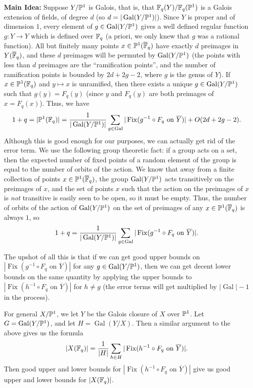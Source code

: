 \documentclass[letterpaper,11pt]{article}
\DeclareMathOperator{\Gal}{Gal}
\DeclareMathOperator{\Fix}{Fix}
\begin{document}
{\bf Main Idea:} Suppose $Y/\mathbb{P}^1$ is Galois, that is, that $\mathbb{F}_q(Y)/\mathbb{F}_q(\mathbb{P}^1)$ is a Galois extension of fields, of degree $d$ (so $d = |\Gal(Y/\PP^1)|$). Since $Y$ is proper and of dimension $1$, every element of $g \in \Gal(Y/\PP^1)$ gives a well defined regular function $g: Y \rightarrow Y$ which is defined over $\mathbb{F}_q$ (a priori, we only knew that $g$ was a rational function). All but finitely many points $x \in \mathbb{P}^1(\overline{\mathbb{F}}_q)$ have exactly $d$ preimages in $Y(\overline{\mathbb{F}}_q)$, and these $d$ preimages will be permuted by $\Gal(Y/\PP^1)$ (the points with less than $d$ preimages are the ``ramification points'', and the number of ramification points is bounded by $2d+2g-2$, where $g$ is the genus of $Y$). If $x \in \mathbb{P}^1(\mathbb{F}_q)$ and $y \mapsto x$ is unramified, then there exists a unique $g \in \Gal(Y/\PP^1)$ such that $g(y) = F_q(y)$ (since $y$ and $F_q(y)$ are both preimages of $x = F_q(x)$). Thus, we have
\[
1 + q = |\PP^1(\FF_q)| = \frac{1}{|\Gal(Y/\PP^1)|} \sum_{g \in \Gal} |\Fix(g^{-1}\circ F_q \text{ on }\overline{Y})| + O(2d+2g-2).
\]
Although this is good enough for our purposes, we can actually get rid of the error term. We use the following group theoretic fact: if a group acts on a set, then the expected number of fixed points of a random element of the group is equal to the number of orbits of the action. We know that away from a finite collection of points $x \in \mathbb{P}^1(\overline{\mathbb{F}}_q)$, the group $\Gal(Y/\PP^1)$ acts transitively on the preimages of $x$, and the set of points $x$ such that the action on the preimages of $x$ is \emph{not} transitive is easily seen to be open, so it must be empty. Thus, the number of orbits of the action of $\Gal(Y/\PP^1)$ on the set of preimages of any $x \in \mathbb{P}^1(\overline{\mathbb{F}}_q)$ is always $1$, so
\[
1 + q = \frac{1}{|\Gal(Y/\PP^1)|} \sum_{g \in \Gal} |\Fix(g^{-1}\circ F_q \text{ on }\overline{Y})|.
\]

The upshot of all this is that if we can get good upper bounds on $|\Fix(g^{-1}\circ F_q \text{ on }\overline{Y})|$ for any $g \in \Gal(Y/\PP^1)$, then we can get decent lower bounds on the same quantity by applying the upper bounds to $|\Fix(h^{-1}\circ F_q \text{ on }\overline{Y})|$ for $h \ne g$ (the error terms will get multiplied by $|\Gal|-1$ in the process).

For general $X/\mathbb{P}^1$, we let $Y$ be the Galois closure of $X$ over $\mathbb{P}^1$. Let $G = \Gal(Y/\PP^1)$, and let $H = \Gal(Y/X)$. Then a similar argument to the above gives us the formula
\[
|X(\FF_q)| = \frac{1}{|H|}\sum_{h \in H} |\Fix(h^{-1}\circ F_q \text{ on } \overline{Y})|.
\]
Then good upper and lower bounds for $|\Fix(h^{-1}\circ F_q \text{ on } \overline{Y})|$ give us good upper and lower bounds for $|X(\mathbb{F}_q)|$.
\end{document}
